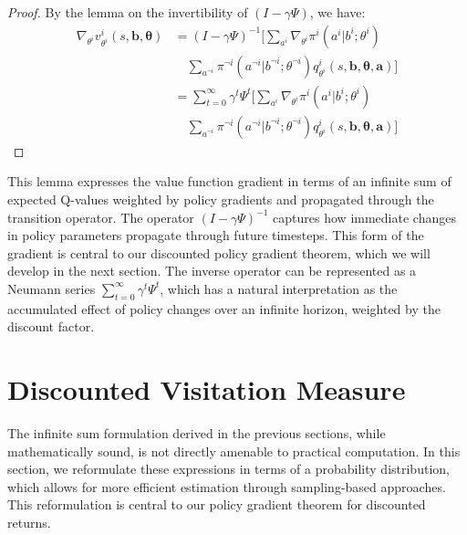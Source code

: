 \begin{proof}
    By the lemma on the invertibility of $(I - \gamma \Psi)$, we have:
    \begin{align}
        \nabla_{\theta^i}v^{i}_{\theta^i}(s, \boldsymbol{b}, \boldsymbol{\theta}) & = (I - \gamma \Psi)^{-1}\Bigg[\sum_{a^i}\nabla_{\theta^i}\pi^{i}(a^{i}|b^{i}; \theta^{i}) \nonumber                                                        \\
                                                                                  & \quad \sum_{a^{\neg i}}\pi^{\neg i}(a^{\neg i}|b^{\neg i}; \theta^{\neg i}) q^{i}_{\theta^i}(s, \boldsymbol{b}, \boldsymbol{\theta}, \boldsymbol{a})\Bigg] \\
                                                                                  & = \sum_{t=0}^{\infty}\gamma^{t} \Psi^{t}\Bigg[\sum_{a^i}\nabla_{\theta^i}\pi^{i}(a^{i}|b^{i}; \theta^{i}) \nonumber                                        \\
                                                                                  & \quad \sum_{a^{\neg i}}\pi^{\neg i}(a^{\neg i}|b^{\neg i}; \theta^{\neg i}) q^{i}_{\theta^i}(s, \boldsymbol{b}, \boldsymbol{\theta}, \boldsymbol{a})\Bigg]
    \end{align}
\end{proof}This lemma expresses the value function gradient in terms of an
infinite sum of expected Q-values weighted by policy gradients and propagated
through the transition operator. The operator $(I - \gamma \Psi)^{-1}$ captures how
immediate changes in policy parameters propagate through future timesteps. This
form of the gradient is central to our discounted policy gradient theorem, which
we will develop in the next section. The inverse operator can be represented as
a Neumann series $\sum_{t=0}^{\infty}\gamma^{t} \Psi^{t}$, which has a natural interpretation
as the accumulated effect of policy changes over an infinite horizon, weighted
by the discount factor.
\section{Discounted Visitation Measure}
The infinite sum formulation derived in the previous sections, while
mathematically sound, is not directly amenable to practical computation. In this
section, we reformulate these expressions in terms of a probability distribution,
which allows for more efficient estimation through sampling-based approaches. This
reformulation is central to our policy gradient theorem for discounted returns.
